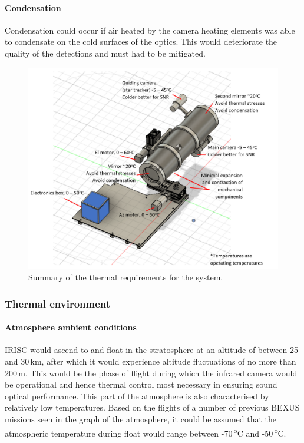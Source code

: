 \paragraph{Condensation}
Condensation could occur if air heated by the camera heating elements was able to condensate on the cold surfaces of the optics. This would deteriorate the quality of the detections and must had to be mitigated.  \

	\begin{figure}[H]
    \centering
    \includegraphics[scale=0.8]{4-experiment-design/img/mechanical/thermalrequirements.PNG}
    	\caption{Summary of the thermal requirements for the system.}
	\label{fig:thermalrequirements}
	\end{figure}





\subsubsection{Thermal environment}
\paragraph{Atmosphere ambient conditions}
IRISC would ascend to and float in the stratosphere at an altitude of between 25 and 30\,km, after which it would experience altitude fluctuations of no more than 200\,m. This would be the phase of flight during which the infrared camera would be operational and hence thermal control most necessary in ensuring sound optical performance. This part of the atmosphere is also characterised by relatively low temperatures. Based on the flights of a number of previous BEXUS missions seen in the graph of the atmosphere, it could be assumed that the atmospheric temperature during float would range between -70\,\textsuperscript{o}C and -50\,\textsuperscript{o}C. \\

